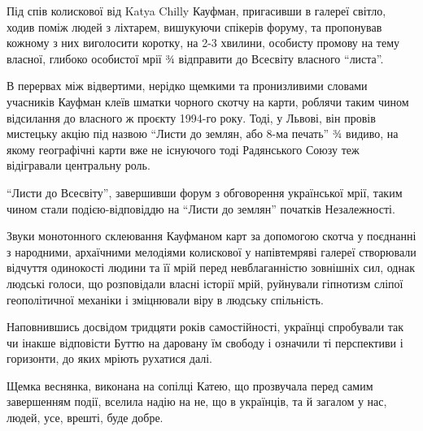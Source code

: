 Під спів колискової від Katya Chilly Кауфман, пригасивши в галереї світло,
ходив поміж людей з ліхтарем, вишукуючи спікерів форуму, та пропонував кожному
з них виголосити коротку, на 2-3 хвилини, особисту промову на тему власної,
глибоко особистої мрії ¾ відправити до Всесвіту власного \enquote{листа}. 

В перервах між відвертими, нерідко щемкими та пронизливими словами учасників
Кауфман клеїв шматки чорного скотчу на карти, роблячи таким чином відсилання до
власного ж проєкту 1994-го року. Тоді, у Львові, він провів мистецьку акцію під
назвою \enquote{Листи до землян, або 8-ма печать} ¾ видиво, на якому географічні карти
вже не існуючого тоді Радянського Союзу теж відігравали центральну роль. 

\enquote{Листи до Всесвіту}, завершивши форум з обговорення української мрії, таким
чином стали подією-відповіддю на \enquote{Листи до землян} початків Незалежності. 

Звуки монотонного склеювання Кауфманом карт за допомогою скотча у поєднанні з
народними, архаїчними мелодіями колискової у напівтемряві галереї створювали
відчуття одинокості людини та її мрій перед невблаганністю зовнішніх сил, однак
людські голоси, що розповідали власні історії мрій, руйнували гіпнотизм сліпої
геополітичної механіки і зміцнювали віру в людську спільність. 

Наповнившись досвідом тридцяти років самостійності, українці спробували так чи
інакше відповісти Буттю на даровану їм свободу і означили ті перспективи і
горизонти, до яких мріють рухатися далі. 

Щемка веснянка, виконана на сопілці Катею, що прозвучала перед самим
завершенням події, вселила надію на не, що в українців, та й загалом у нас,
людей, усе, врешті, буде добре.
